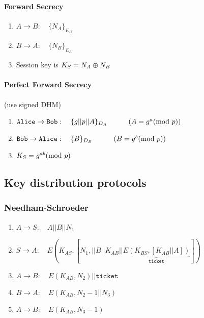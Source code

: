 \paragraph{Forward Secrecy}
\begin{enumerate}
    \item $A\rightarrow B:\hspace{1em} \{N_A\}_{E_B}$
    \item $B\rightarrow A:\hspace{1em} \{N_B\}_{E_A}$
    \item Session key is $K_S=N_A\oplus N_B$
\end{enumerate}
\paragraph{Perfect Forward Secrecy} (use signed DHM)
\begin{enumerate}
    \item $\texttt{Alice}\rightarrow \texttt{Bob}:\hspace{1em} \{g||p||A\}_{D_A}\hspace{3em} (A=g^a(\mathrm{mod}\ p))$
    \item $\texttt{Bob}\rightarrow \texttt{Alice}:\hspace{1em} \{B\}_{D_B}\hspace{3em} (B=g^b(\mathrm{mod}\ p))$
    \item $K_S=g^{ab}(\mathrm{mod}\ p)$
\end{enumerate}
\subsection{Key distribution protocols}
\subsubsection{Needham-Schroeder}
\begin{enumerate}
    \item $A\rightarrow S:\hspace{1em} A||B||N_1$
    \item $S\rightarrow A:\hspace{1em} E(K_{AS},[N_1,||B||K_{AB}||\underbrace{E(K_{BS},[K_{AB}||A])}_{\texttt{ticket}}])$
    \item $A\rightarrow B:\hspace{1em} E(K_{AB},N_2)||\texttt{ticket}$
    \item $B\rightarrow A:\hspace{1em} E(K_{AB},N_2-1||N_3)$
    \item $A\rightarrow B:\hspace{1em} E(K_{AB},N_3-1)$
\end{enumerate}
